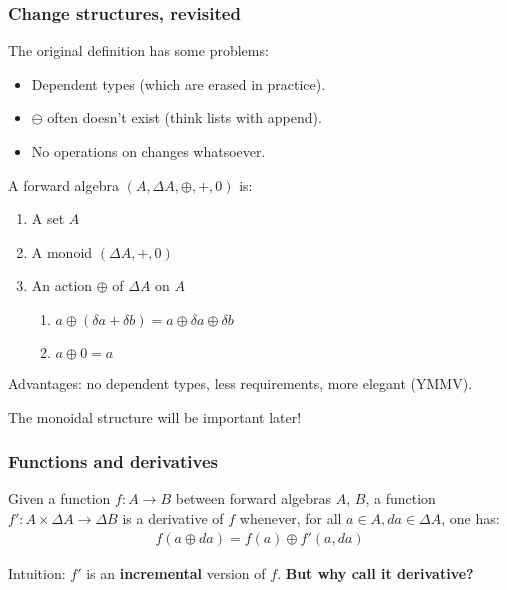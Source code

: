 \documentclass[english]{beamer}
\theoremstyle{plain}
\theoremstyle{remark}
\theoremstyle{remark}
\theoremstyle{remark}
\theoremstyle{definition}
\theoremstyle{definition}
\newcommand{\ra}[0]{\rightarrow}
\begin{document}
\begin{frame}
  \frametitle{Change structures, revisited}
  The original definition has some problems:
  \begin{itemize}
    \item Dependent types (which are erased in practice).
    \item $\ominus$ often doesn't exist (think lists with append).
    \item No operations on changes whatsoever.
  \end{itemize}
  \vfill
  \begin{definition}
    A forward algebra $(A, \Delta A, \oplus, +, 0)$ is:
    \begin{enumerate}
      \item A set $A$
      \item A monoid $(\Delta A, +, 0)$
      \item An action $\oplus$ of $\Delta A$ on $A$
        \begin{enumerate}
        \item $a \oplus (\delta a + \delta b) = a \oplus \delta a \oplus \delta b$
        \item $a \oplus 0 = a$
        \end{enumerate}
    \end{enumerate}
  \end{definition}
  \vfill
  Advantages: no dependent types, less requirements, more elegant (YMMV).

  The monoidal structure will be important later!
\end{frame}

\begin{frame}
  \frametitle{Functions and derivatives}
  \begin{definition}[derivative]
    Given a function $f : A \ra B$ between forward algebras $A$, $B$, a function
    $f' : A \times \Delta A \ra \Delta B$ is a derivative of $f$ whenever, for all $a \in A,
    da \in \Delta A$, one has:
    \begin{align*}
      f(a \oplus da) = f(a) \oplus f'(a, da)
    \end{align*}
  \end{definition}
  \vfill
  Intuition: $f'$ is an \textbf{incremental} version of $f$.
  \vfill
  \textbf{But why call it derivative?}
\end{frame}
\end{document}

